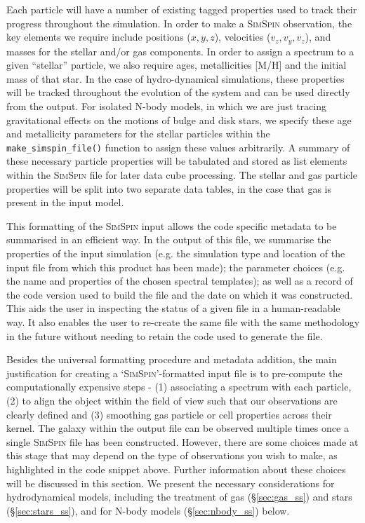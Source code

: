 \documentclass[
  journal=pasa,
  manuscript=research-paper, %
  year=2020,
  volume=37,
]{cup-journal}
\newcommand{\simspin}[1]{\textsc{SimSpin}#1} %
\newcommand{\makesimspinfile}[1]{\texttt{make\_simspin\_file()}#1}
\begin{document}
Each particle will have a number of existing tagged properties used to track their progress throughout the simulation. 
In order to make a \simspin{} observation, the key elements we require include positions ($x, y, z$), velocities ($v_z, v_y, v_z$), and masses for the stellar and/or gas components. 
In order to assign a spectrum to a given ``stellar'' particle, we also require ages, metallicities [M/H] and the initial mass of that star. 
In the case of hydro-dynamical simulations, these properties will be tracked throughout the evolution of the system and can be used directly from the output.
For isolated N-body models, in which we are just tracing gravitational effects on the motions of bulge and disk stars, we specify these age and metallicity parameters for the stellar particles within the \makesimspinfile{} function to assign these values arbitrarily. 
A summary of these necessary particle properties will be tabulated and stored as list elements within the \simspin{} file for later data cube processing. 
The stellar and gas particle properties will be split into two separate data tables, in the case that gas is present in the input model. 

This formatting of the \simspin{} input allows the code specific metadata to be summarised in an efficient way. 
In the output of this file, we summarise the properties of the input simulation (e.g. the simulation type and location of the input file from which this product has been made); the parameter choices (e.g. the name and properties of the chosen spectral templates); as well as a record of the code version used to build the file and the date on which it was constructed. 
This aids the user in inspecting the status of a given file in a human-readable way.
It also enables the user to re-create the same file with the same methodology in the future without needing to retain the code used to generate the file. 

Besides the universal formatting procedure and metadata addition, the main justification for creating a `\simspin{}'-formatted input file is to pre-compute the computationally expensive steps - (1) associating a spectrum with each particle, (2) to align the object within the field of view such that our observations are clearly defined and (3) smoothing gas particle or cell properties across their kernel. 
The galaxy within the output file can be observed multiple times once a single \simspin{} file has been constructed. 
However, there are some choices made at this stage that may depend on the type of observations you wish to make, as highlighted in the code snippet above. 
Further information about these choices will be discussed in this section.
We present the necessary considerations for hydrodynamical models, including the treatment of gas (\S \ref{sec:gas_ss}) and stars (\S \ref{sec:stars_ss}), and for N-body models (\S \ref{sec:nbody_ss}) below.
\end{document}
